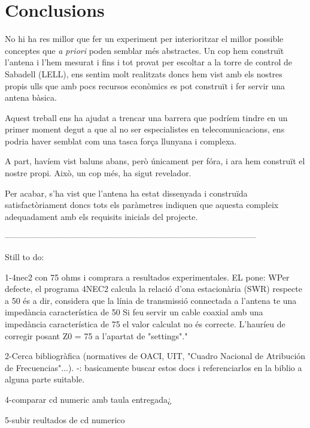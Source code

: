 \chapter{Conclusions}

No hi ha res millor que fer un experiment per interioritzar el millor possible conceptes que \textit{a priori} poden semblar més abstractes. Un cop hem construït l'antena i l'hem mesurat i fins i tot provat per escoltar a la torre de control de Sabadell (LELL), ens sentim molt realitzats doncs hem vist amb els nostres propis ulls que amb pocs recursos econòmics es pot construït i fer servir una antena bàsica.

Aquest treball ens ha ajudat a trencar una barrera que podríem tindre en un primer moment degut a que al no ser especialistes en telecomunicacions, ens podria haver semblat com una tasca força llunyana i complexa.

A part, havíem vist baluns abans, però únicament per fóra, i ara hem construït el nostre propi. Això, un cop més, ha sigut revelador. 

Per acabar, s'ha vist que l'antena ha estat dissenyada i construïda satisfactòriament doncs tots els paràmetres indiquen que aquesta compleix adequadament amb els requisits inicials del projecte.

------------------------------------------------------------------------------------------

Still to do:

1-4nec2 con 75 ohms i comprara a resultados experimentales. EL pone:
WPer defecte, el programa 4NEC2 calcula la relació d'ona estacionària (SWR) respecte a
50  és a dir, considera que la línia de transmissió connectada a l'antena te una
impedància característica de 50 Si feu servir un cable coaxial amb una impedància
característica de 75 el valor calculat no és correcte. L'hauríeu de corregir posant Z0 =
75 a l'apartat de "settings"." 

2-Cerca bibliogràfica (normatives de OACI, UIT, "Cuadro Nacional de Atribución de
Frecuencias"...). -: basicamente buscar estos docs i referenciarlos en la biblio a alguna parte suitable.

4-comparar cd numeric amb taula entregada¿

5-subir reultados de cd numerico
